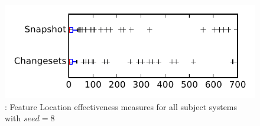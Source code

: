 
\begin{figure}
\centering
\includegraphics[height=0.4\textheight]{figures/flt_seed/rq1_tiny_8}
\caption{\rone: Feature Location effectiveness measures for all subject systems with $seed=8$}
\label{fig:flt_seed:rq1:tiny}
\end{figure}
